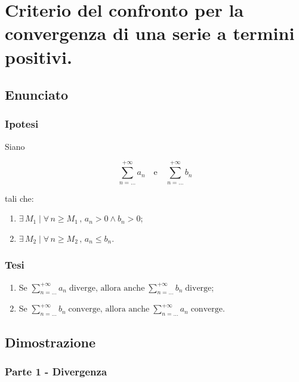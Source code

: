 \documentclass[../dimostrazioni]{subfiles}
\begin{document}
    \chapter{Criterio del confronto per la convergenza di una serie a termini positivi.}
    \label{serieconfronto}

        \section*{Enunciato}

            \subsection*{Ipotesi}

                Siano

                \[  \sum_{n=\dots}^{+\infty} a_n \quad \text{e} \quad  \sum_{n=\dots}^{+\infty} b_n   \]

                tali che:
                \begin{enumerate}
                    \indentitem \item \(\exists \, M_1 \mid \forall \, n \geqslant M_1\,,\, a_n > 0 \land b_n > 0  \);
                    \indentitem \item \(\exists \, M_2 \mid \forall \, n \geqslant M_2\,,\, a_n \leqslant b_n \).
                \end{enumerate}
                
            \subsection*{Tesi}
                \begin{enumerate}
                    \indentitem \item Se \(\sum_{n=\dots}^{+\infty} a_n \; \text{diverge, allora anche} \; \sum_{n=\dots}^{+\infty} b_n \; \text{diverge} \);
                    \indentitem \item Se \(\sum_{n=\dots}^{+\infty} b_n \; \text{converge, allora anche} \; \sum_{n=\dots}^{+\infty} a_n \; \text{converge} \).
                \end{enumerate}
                

        \section*{Dimostrazione}

            \subsection*{Parte 1 - Divergenza}
\end{document}
